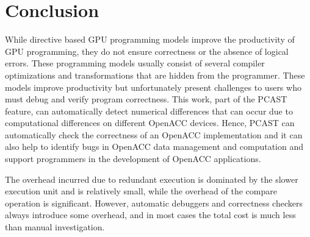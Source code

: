 \section{Conclusion}

While directive based GPU programming models improve the productivity of GPU programming, they do not ensure correctness or the absence of logical errors.
These programming models usually consist of several compiler optimizations and transformations that are hidden from the programmer.
These models improve productivity but unfortunately present challenges to users who must debug and verify program correctness.
This work, part of the PCAST feature, can automatically detect numerical differences that can occur due to computational differences on different OpenACC devices.
Hence, PCAST can automatically check the correctness of an OpenACC implementation and it can also help to identify bugs in OpenACC data management and computation and support programmers in the development of OpenACC applications.

The overhead incurred due to redundant execution is dominated by the slower execution unit and is relatively small, while the overhead of the compare operation is significant.
However, automatic debuggers and correctness checkers always introduce some overhead, and in most cases the total cost is much less than manual investigation.
